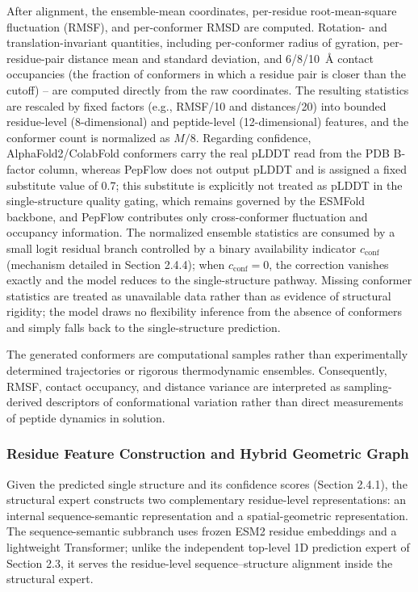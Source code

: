 \documentclass[12pt]{article}
\begin{document}
After alignment, the ensemble-mean coordinates,
per-residue root-mean-square fluctuation (RMSF), and per-conformer RMSD are
computed. Rotation- and translation-invariant quantities, including per-conformer
radius of gyration, per-residue-pair distance mean and standard deviation, and
6/8/10~\AA{} contact occupancies (the fraction of conformers in which a residue
pair is closer than the cutoff) -- are computed directly from the raw
coordinates. The resulting statistics are rescaled by fixed factors (e.g.,
RMSF/10 and distances/20) into bounded residue-level (8-dimensional) and
peptide-level (12-dimensional) features, and the conformer count is normalized
as $M/8$. Regarding confidence, AlphaFold2/ColabFold conformers carry the
real pLDDT read from the PDB B-factor column, whereas PepFlow does not output
pLDDT and is assigned a fixed substitute value of 0.7; this substitute is
explicitly not treated as pLDDT in the single-structure quality gating, which
remains governed by the ESMFold backbone, and PepFlow contributes only
cross-conformer fluctuation and occupancy information. The normalized
ensemble statistics are consumed by a small logit residual branch controlled
by a binary availability indicator $c_{\mathrm{conf}}$ (mechanism detailed in
Section 2.4.4); when $c_{\mathrm{conf}} = 0$, the correction vanishes exactly
and the model reduces to the single-structure pathway. Missing conformer
statistics are treated as unavailable data rather than as evidence of
structural rigidity; the model draws no flexibility inference from the absence
of conformers and simply falls back to the single-structure prediction.


The generated conformers are computational samples rather than experimentally
determined trajectories or rigorous thermodynamic ensembles. Consequently,
RMSF, contact occupancy, and distance variance are interpreted as
sampling-derived descriptors of conformational variation rather than direct
measurements of peptide dynamics in solution.

\subsubsection{Residue Feature Construction and Hybrid Geometric Graph}
Given the predicted single structure and its confidence scores (Section 2.4.1),
the structural expert constructs two complementary residue-level
representations: an internal sequence-semantic representation and a
spatial-geometric representation. The sequence-semantic subbranch uses frozen
ESM2 residue embeddings \cite{lin2023esmfold} and a lightweight Transformer;
unlike the independent top-level 1D prediction expert of Section 2.3, it
serves the residue-level sequence--structure alignment inside the structural
expert.
\end{document}
